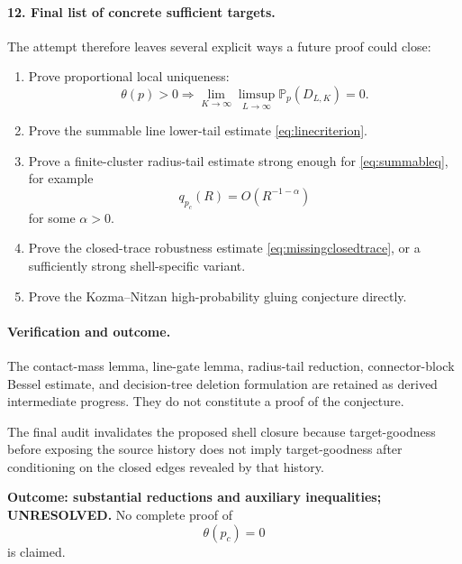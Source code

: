 \documentclass[11pt]{article}
\begin{document}
\paragraph{12. Final list of concrete sufficient targets.}
The attempt therefore leaves several explicit ways a future proof could close:
\begin{enumerate}
\item Prove proportional local uniqueness:
\[
\theta(p)>0
\Longrightarrow
\lim_{K\to\infty}\limsup_{L\to\infty}\mathbb P_p(D_{L,K})=0.
\]

\item Prove the summable line lower-tail estimate \eqref{eq:linecriterion}.

\item Prove a finite-cluster radius-tail estimate strong enough for \eqref{eq:summableq}, for example
\[
q_{p_c}(R)=O(R^{-1-\alpha})
\]
for some \(\alpha>0\).

\item Prove the closed-trace robustness estimate \eqref{eq:missingclosedtrace}, or a sufficiently strong shell-specific variant.

\item Prove the Kozma--Nitzan high-probability gluing conjecture directly.
\end{enumerate}

\paragraph{Verification and outcome.}
The contact-mass lemma, line-gate lemma, radius-tail reduction, connector-block Bessel estimate, and decision-tree deletion formulation are retained as derived intermediate progress. They do not constitute a proof of the conjecture.

The final audit invalidates the proposed shell closure because target-goodness before exposing the source history does not imply target-goodness after conditioning on the closed edges revealed by that history.

\textbf{Outcome: substantial reductions and auxiliary inequalities; UNRESOLVED.}
No complete proof of
\[
\theta(p_c)=0
\]
is claimed.
\end{document}
